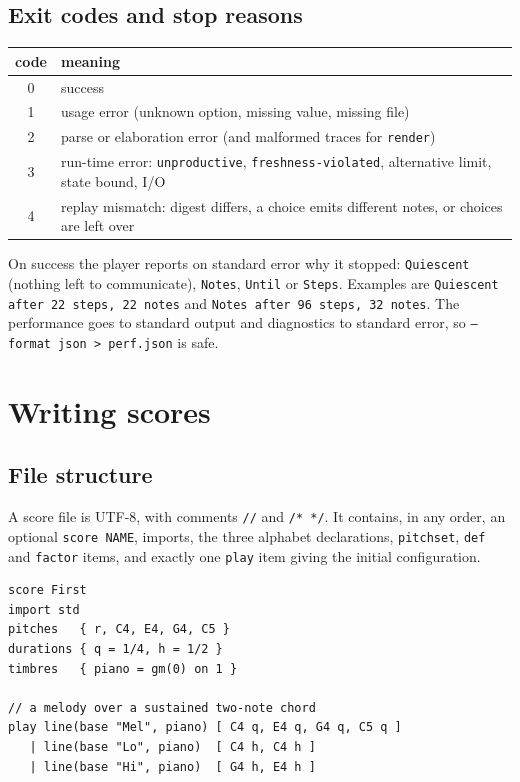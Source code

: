 \documentclass[11pt,a4paper]{article}
\newcommand{\ttx}[1]{\texttt{#1}}
\begin{document}
\subsection{Exit codes and stop reasons}

\begin{center}
\small
\begin{tabular}{@{}cl@{}}
\toprule
code & meaning \\
\midrule
0 & success \\
1 & usage error (unknown option, missing value, missing file) \\
2 & parse or elaboration error (and malformed traces for \ttx{render}) \\
3 & run-time error: \ttx{unproductive}, \ttx{freshness-violated}, alternative
  limit, state bound, I/O \\
4 & replay mismatch: digest differs, a choice emits different notes, or
  choices are left over \\
\bottomrule
\end{tabular}
\end{center}

\noindent On success the player reports on standard error why it stopped:
\ttx{Quiescent} (nothing left to communicate), \ttx{Notes}, \ttx{Until} or
\ttx{Steps}. Examples are \ttx{Quiescent after 22 steps, 22 notes} and
\ttx{Notes after 96 steps, 32 notes}. The performance goes to standard output
and diagnostics to standard error, so \ttx{--format json > perf.json} is safe.

\section{Writing scores}\label{sec:write}

\subsection{File structure}

A score file is UTF-8, with comments \ttx{//} and \ttx{/* */}. It contains, in
any order, an optional \ttx{score NAME}, imports, the three alphabet
declarations, \ttx{pitchset}, \ttx{def} and \ttx{factor} items, and exactly one
\ttx{play} item giving the initial configuration.

\begin{lstlisting}[language=score]
score First
import std
pitches   { r, C4, E4, G4, C5 }
durations { q = 1/4, h = 1/2 }
timbres   { piano = gm(0) on 1 }

// a melody over a sustained two-note chord
play line(base "Mel", piano) [ C4 q, E4 q, G4 q, C5 q ]
   | line(base "Lo", piano)  [ C4 h, C4 h ]
   | line(base "Hi", piano)  [ G4 h, E4 h ]
\end{lstlisting}
\end{document}

